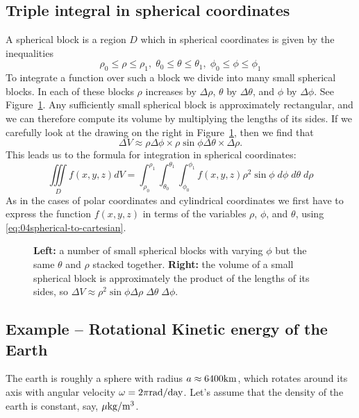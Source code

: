 \subsection{Triple integral in spherical coordinates}  
A spherical block is a region $D$ which in spherical coordinates is given by
the inequalities
\[
\rho_0\le \rho\le \rho_1, \; \theta_0\le\theta\le\theta_1,\;
\phi_0\le \phi\le\phi_1
\]
To integrate a function over such a block we divide into many small
spherical blocks.  In each of these blocks $\rho$ increases by
$\Delta\rho$, $\theta$ by $\Delta\theta$, and $\phi$ by $\Delta\phi$.
See Figure~\ref{fig:04spherical-volume-element}.  Any sufficiently small
spherical block is approximately rectangular, and we can therefore
compute its volume by multiplying the lengths of its sides.  If we
carefully look at the drawing on the right in
Figure~\ref{fig:04spherical-volume-element}, then we find that 
\[
\Delta V \approx \rho\Delta\phi\times \rho\sin\phi\Delta\theta \times
\Delta\rho.
\]
%
This leads us to the formula for integration in spherical coordinates:
\begin{equation}
    \iiint\limits_D f(x, y, z) dV
    = 
    \int_{\rho_0}^{\rho_1} \int_{\theta_0}^{\theta_1}
    \int_{\phi_0}^{\phi_1} f(x, y, z)
    \rho^2\sin\phi\; d\phi \; d\theta\; d\rho
    \label{eq:04-tripleint-spherical}
\end{equation}
As in the cases of polar coordinates and cylindrical coordinates we first
have to express the function $f(x, y, z)$ in terms of the variables
$\rho$, $\phi$, and $\theta$, using \eqref{eq:04spherical-to-cartesian}.

\begin{figure}[t]
  \hfill
  
  \caption{\textbf{Left: } a number of small spherical blocks with varying
  $\phi$ but the same $\theta$ and $\rho$ stacked together.
  \textbf{Right: } the volume of a small spherical block is approximately
  the product of the lengths of its sides, so $\Delta V \approx
  \rho^2\sin\phi \Delta\rho\; \Delta\theta\; \Delta\phi$.}
  \label{fig:04spherical-volume-element}
\end{figure}


\subsection{Example -- Rotational Kinetic energy of the Earth}  
The earth is roughly a sphere with radius $a \approx
6400{\rm km}$, which rotates around its axis with angular velocity
$\omega = 2\pi {\rm rad} /{\rm day}$.  Let's assume that the density
of the earth is constant, say, $\mu {\rm kg}/{\rm m}^3$.


